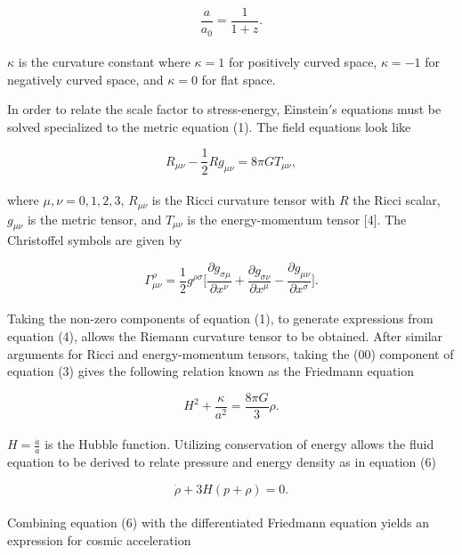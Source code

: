 \documentclass[12pt]{article}
\begin{document}
\begin{equation}
\frac{a}{a_0} = \frac{1}{1+z}.
\end{equation}
\\
$\kappa$ is the curvature constant where $\kappa = 1$ for positively curved space, $\kappa = -1$ for negatively curved space, and $\kappa = 0$ for flat space. 

In order to relate the scale factor to stress-energy, Einstein$'$s equations must be solved specialized to the metric equation (1). The field equations look like 

\begin{equation}
R_{\mu \nu} - \frac{1}{2}Rg_{\mu \nu} = 8\pi GT_{\mu \nu}, 
\end{equation}
\\
\noindent where $\mu, \nu = 0,1,2,3$, $R_{\mu \nu}$ is the Ricci curvature tensor with $R$ the Ricci scalar, $g_{\mu \nu}$ is the metric tensor, and $T_{\mu \nu}$ is the energy-momentum tensor [4]. The Christoffel symbols are given by

\begin{equation}
\Gamma_{\mu \nu}^\rho=\frac{1}{2}g^{\rho \sigma} \bigg[ \frac{\partial g_{\sigma \mu} } {\partial x^\nu}+ \frac{\partial g_{\sigma \nu} } {\partial x^\mu} - \frac{\partial g_{\mu \nu} } {\partial x^\sigma} \bigg].
\end{equation}
\\
Taking the non-zero components of equation (1), to generate expressions from equation (4), allows the Riemann curvature tensor to be obtained. After similar arguments for Ricci and energy-momentum tensors, taking the (00) component of equation (3) gives the following relation known as the Friedmann equation

\begin{equation}
H^2 + \frac{\kappa}{a^2}=\frac{8\pi G}{3} \rho.
\end{equation}
\\ 
$H=\frac{\dot a}{a}$ is the Hubble function. Utilizing conservation of energy allows the fluid equation to be derived to relate pressure and energy density as in equation (6)

\begin{equation}
\dot \rho + 3H(p+\rho)=0.
\end{equation}
\\ 
Combining equation (6) with the differentiated Friedmann equation yields an expression for cosmic acceleration 
\end{document}
